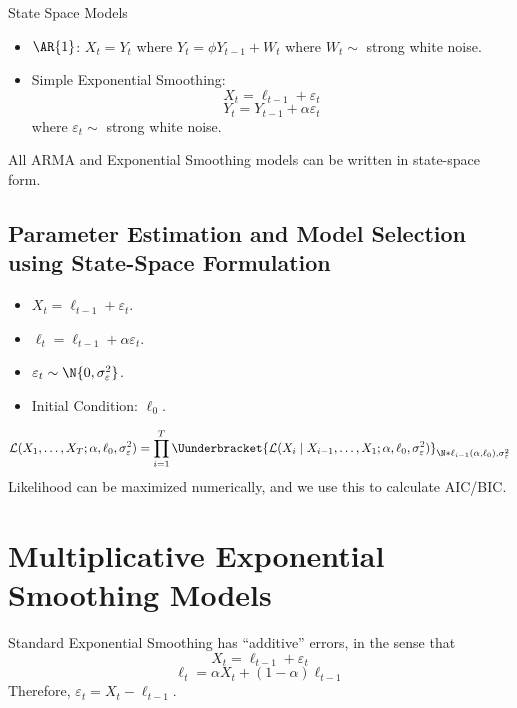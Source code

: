 \begin{Example}{State Space Models}{}
      \begin{itemize}
            \item $ \AR{1} $: $ X_t=Y_t $ where $ Y_t=\phi Y_{t-1}+W_t $
                  where $ W_t \sim  $ strong white noise.
            \item Simple Exponential Smoothing:
                  \[ X_t=\ell_{t-1}+\varepsilon_t \]
                  \[ Y_t=Y_{t-1}+\alpha \varepsilon_t \]
                  where $ \varepsilon_t \sim  $ strong white noise.
      \end{itemize}
      All ARMA and Exponential Smoothing models can be written in state-space form.
\end{Example}
\subsection*{Parameter Estimation and Model Selection using State-Space Formulation}
\begin{itemize}
      \item $ X_t=\ell_{t-1}+\varepsilon_t $.
      \item $ \ell_t=\ell_{t-1}+\alpha\varepsilon_t $.
      \item $ \varepsilon_t \sim \N{0,\sigma_\varepsilon^2} $.
      \item Initial Condition: $ \ell_0 $.
\end{itemize}
\[ \mathcal{L}(X_1,\ldots,X_T;\alpha,\ell_0,\sigma_\varepsilon^2)=
      \prod_{i=1}^T \Uunderbracket{\mathcal{L}(X_i\mid X_{i-1},\ldots,X_1;\alpha,\ell_0,\sigma_\varepsilon^2)}_{
      \N*{\ell_{i-1}(\alpha,\ell_0),\sigma_\varepsilon^2}
      } \]
Likelihood can be maximized numerically, and we use this to calculate AIC/BIC\@.

\section{Multiplicative Exponential Smoothing Models}
Standard Exponential Smoothing has ``additive'' errors, in the sense that
\[ X_t=\ell_{t-1}+\varepsilon_t \]
\[ \ell_t=\alpha X_t+(1-\alpha)\ell_{t-1} \]
Therefore, $ \varepsilon_t=X_t-\ell_{t-1} $.

